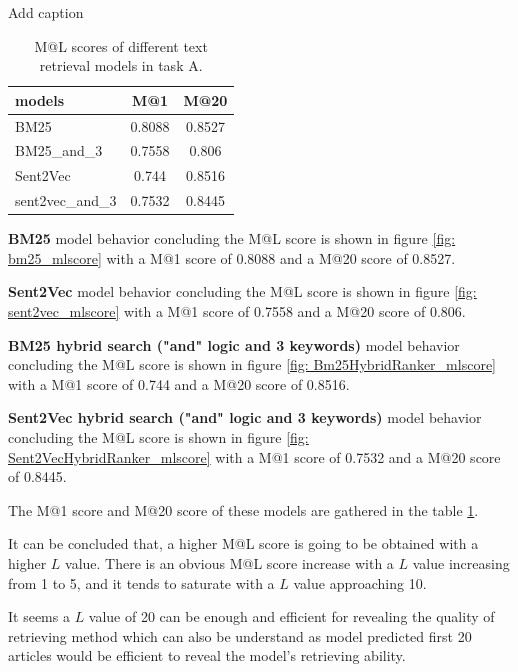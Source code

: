 \documentclass[10pt,a4paper,fleqn]{report}
\begin{document}
					\begin{table}[htbp]
						\centering
						\caption{Add caption}
						\begin{tabular}{lcc}
							\toprule
							models & M@1   & M@20 \\
							\midrule
							BM25  & 0.8088 & 0.8527 \\
							BM25\_and\_3 & 0.7558 & 0.806 \\
							Sent2Vec & 0.744 & 0.8516 \\
							sent2vec\_and\_3 & 0.7532 & 0.8445 \\
							\bottomrule
						\end{tabular}%
						\caption{M@L scores of different text retrieval models in task A.}
						\label{tab: models_ml_scores}%
					\end{table}%
										
					
					\textbf{BM25} 
					model behavior concluding the M@L score is shown in figure \ref{fig: bm25_mlscore} with a M@1 score of 0.8088 and a M@20 score of 0.8527.
					
					\textbf{Sent2Vec} 
					model behavior concluding the M@L score is shown in figure \ref{fig: sent2vec_mlscore} with a M@1 score of 0.7558 and a M@20 score of 0.806.
					
					\textbf{BM25 hybrid search ("and" logic and 3 keywords)} 
					model behavior concluding the M@L score is shown in figure \ref{fig: Bm25HybridRanker_mlscore} with a M@1 score of 0.744 and a M@20 score of 0.8516.
					
					\textbf{Sent2Vec hybrid search ("and" logic and 3 keywords)} 
					model behavior concluding the M@L score is shown in figure \ref{fig: Sent2VecHybridRanker_mlscore} with a M@1 score of 0.7532 and a M@20 score of 0.8445.
					
					The M@1 score and M@20 score of these models are gathered in the table \ref{tab: models_ml_scores}.
					
					It can be concluded that, a higher M@L score is going to be obtained with a higher $L$ value. There is an obvious M@L score increase with a $L$ value increasing from 1 to 5, and it tends to saturate with a $ L $ value approaching 10.
					
					It seems a $L$ value of 20 can be enough and efficient for revealing the quality of retrieving method which can also be understand as model predicted first 20 articles would be efficient to reveal the model's retrieving ability.
					
\end{document}
